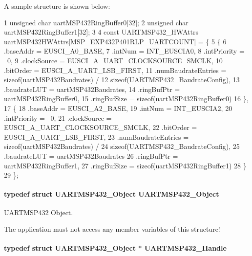 A sample structure is shown below\+: 
\begin{DoxyCode}
1 unsigned char uartMSP432RingBuffer0[32];
2 unsigned char uartMSP432RingBuffer1[32];
3 
4 const UARTMSP432\_HWAttrs uartMSP432HWAttrs[MSP\_EXP432P401RLP\_UARTCOUNT] = \{
5     \{
6         .baseAddr = EUSCI\_A0\_BASE,
7         .intNum = INT\_EUSCIA0,
8         .intPriority = ~0,
9         .clockSource = EUSCI\_A\_UART\_CLOCKSOURCE\_SMCLK,
10         .bitOrder = EUSCI\_A\_UART\_LSB\_FIRST,
11         .numBaudrateEntries = sizeof(uartMSP432Baudrates) /
12                               sizeof(UARTMSP432\_BaudrateConfig),
13         .baudrateLUT = uartMSP432Baudrates,
14         .ringBufPtr  = uartMSP432RingBuffer0,
15         .ringBufSize = sizeof(uartMSP432RingBuffer0)
16     \},
17     \{
18         .baseAddr = EUSCI\_A2\_BASE,
19         .intNum = INT\_EUSCIA2,
20         .intPriority = ~0,
21         .clockSource = EUSCI\_A\_UART\_CLOCKSOURCE\_SMCLK,
22         .bitOrder = EUSCI\_A\_UART\_LSB\_FIRST,
23         .numBaudrateEntries = sizeof(uartMSP432Baudrates) /
24                               sizeof(UARTMSP432\_BaudrateConfig),
25         .baudrateLUT = uartMSP432Baudrates
26         .ringBufPtr  = uartMSP432RingBuffer1,
27         .ringBufSize = sizeof(uartMSP432RingBuffer1)
28     \}
29 \};
\end{DoxyCode}
\paragraph[{U\+A\+R\+T\+M\+S\+P432\+\_\+\+Object}]{\setlength{\rightskip}{0pt plus 5cm}typedef struct {\bf U\+A\+R\+T\+M\+S\+P432\+\_\+\+Object}  {\bf U\+A\+R\+T\+M\+S\+P432\+\_\+\+Object}}\label{_u_a_r_t_m_s_p432_8h_a033bd8e3088bba16d5b001a647330d88}


U\+A\+R\+T\+M\+S\+P432 Object. 

The application must not access any member variables of this structure! 
\paragraph[{U\+A\+R\+T\+M\+S\+P432\+\_\+\+Handle}]{\setlength{\rightskip}{0pt plus 5cm}typedef struct {\bf U\+A\+R\+T\+M\+S\+P432\+\_\+\+Object} $\ast$ {\bf U\+A\+R\+T\+M\+S\+P432\+\_\+\+Handle}}\label{_u_a_r_t_m_s_p432_8h_a507727808b1fc4b980a69bdf4ec54b53}


